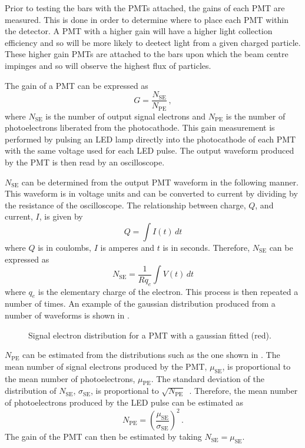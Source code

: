 Prior to testing the bars with the PMTs attached, the gains of each PMT are measured.
This is done in order to determine where to place each PMT within the detector.
A PMT with a higher gain will have a higher light collection efficiency and so will be more likely to deetect light from a given charged particle.
These higher gain PMTs are attached to the bars upon which the beam centre impinges and so will observe the highest flux of particles.

The gain of a PMT can be expressed as
\begin{equation}
  G = \frac{N_{\text{SE}}}{N_{\text{PE}}} \, ,
\end{equation}
where $N_{\text{SE}}$ is the number of output signal electrons and $N_{\text{PE}}$ is the number of photoelectrons liberated from the photocathode.
This gain measurement is performed by pulsing an LED lamp directly into the photocathode of each PMT with the same voltage used for each LED pulse.
The output waveform produced by the PMT is then read by an oscilloscope.

$N_{\text{SE}}$ can be determined from the output PMT waveform in the following manner.
This waveform is in voltage units and can be converted to current by dividing by the resistance of the oscilloscope.
The relationship between charge, $Q$, and current, $I$, is given by
\begin{equation}
  Q = \int I(t) \, dt
\end{equation}
where $Q$ is in coulombs, $I$ is amperes and $t$ is in seconds.
Therefore, $N_{\text{SE}}$ can be expressed as
\begin{equation}
  N_{\text{SE}} = \frac{1}{R q_{e}} \int V(t) \, dt
\end{equation}
where $q_{e}$ is the elementary charge of the electron.
This process is then repeated a number of times.
An example of the gaussian distribution produced from a number of waveforms is shown in .

\begin{figure}[h]
  \begin{adjustbox}{max totalsize={.8\textwidth}, center}
    
  \end{adjustbox}
  \caption[Signal electron distribution for a PMT]{Signal electron distribution for a PMT with a gaussian fitted (red).}
  \label{fig:N_se}
\end{figure}

$N_{\text{PE}}$ can be estimated from the distributions such as the one shown in .
The mean number of signal electrons produced by the PMT, $\mu_{\text{SE}}$, is proportional to the mean number of photoelectrons, $\mu_{\text{PE}}$.
The standard deviation of the distribution of $N_{\text{SE}}$, $\sigma_{\text{SE}}$, is proportional to $\sqrt{N_{\text{PE}}}$~\cite{photoelectrons}.
Therefore, the mean number of photoelectrons produced by the LED pulse can be estimated as
\begin{equation}
  N_{\text{PE}} = \left( \frac{ \mu_{\text{SE}} }{ \sigma_{\text{SE}} }  \right)^{2} \, .
\end{equation}
The gain of the PMT can then be estimated by taking $N_{\text{SE}} = \mu_{\text{SE}}$.

